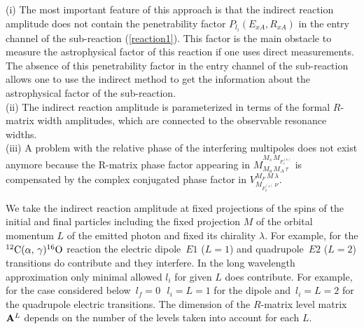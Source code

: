 \documentclass[prl,unsortedaddress,groupedaddress,twocolumn,amsmath,amsfonts,amssymb,showpacs,floatfix,nofootinbib]{revtex4}
\begin{document}
(i) The most important feature of this approach is that the indirect reaction amplitude does not contain 
the penetrability factor $P_{l_{i}}(E_{xA},R_{xA})$ in the entry channel of the sub-reaction (\ref{reaction1}). This factor is the main obstacle to measure the astrophysical factor of this reaction if one uses direct measurements. 
The absence of this penetrability factor in the entry channel of the sub-reaction allows one to use the indirect method to get the information about the astrophysical factor of the sub-reaction.\\
(ii) The indirect reaction amplitude is parameterized in terms of the formal $R$-matrix  width amplitudes, which are connected to the observable resonance widths.\\
(iii) A problem with the relative phase of the interfering multipoles does not exist anymore
because the R-matrix phase factor appearing in $M_{M_{a}\,M_{A}\,\tau}^{M_{s}\,M_{F_{\tau}^{(s)}}}$ is compensated by the complex conjugated phase factor in $V_{M_{F_{\nu}^{(s)}}\,\nu}^{M_{F}\,M\,\lambda}$. 

We take the indirect reaction amplitude at fixed projections of the spins of the initial and final particles including the fixed projection $M$ of the orbital momentum $L$ of the emitted photon and fixed its chirality $\lambda$.  For example, for the ${}^{12}{\rm C}(\alpha,\,\gamma){}^{16}{\rm O}$ reaction the electric dipole $\,E1$ ($L=1$) and quadrupole $\,E2$ ($L=2$) transitions do contribute and they interfere. In the long wavelength approximation only minimal allowed $l_{i}$ for given $L$ does contribute. For example, for the case considered below $\,l_{f}=0$ $\,\,l_{i}=L=1$ for the dipole  and $\,l_{i}=L=2$ for the quadrupole electric transitions. The dimension of the $R$-matrix level matrix ${\rm {\bf A}}^{L} $ depends on the number of the levels taken into account for each $L$. 
\end{document}
